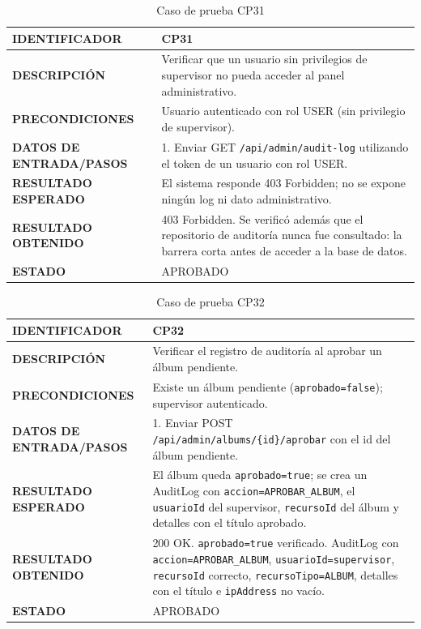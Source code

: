 \begin{table}[H]
\centering
\caption{Caso de prueba CP31}
\begin{tabular}{|p{3.5cm}|p{10.3cm}|}
\hline
\textbf{IDENTIFICADOR} & CP31 \\
\hline
\textbf{DESCRIPCIÓN} & Verificar que un usuario sin privilegios de supervisor no pueda acceder al panel administrativo. \\
\hline
\textbf{PRECONDICIONES} & Usuario autenticado con rol USER (sin privilegio de supervisor). \\
\hline
\textbf{DATOS DE ENTRADA/PASOS} & 1. Enviar GET \texttt{/api/admin/audit-log} utilizando el token de un usuario con rol USER. \\
\hline
\textbf{RESULTADO ESPERADO} & El sistema responde 403 Forbidden; no se expone ningún log ni dato administrativo. \\
\hline
\textbf{RESULTADO OBTENIDO} & 403 Forbidden. Se verificó además que el repositorio de auditoría nunca fue consultado: la barrera corta antes de acceder a la base de datos. \\
\hline
\textbf{ESTADO} & APROBADO \\
\hline
\end{tabular}
\end{table}

\begin{table}[H]
\centering
\caption{Caso de prueba CP32}
\begin{tabular}{|p{3.5cm}|p{10.3cm}|}
\hline
\textbf{IDENTIFICADOR} & CP32 \\
\hline
\textbf{DESCRIPCIÓN} & Verificar el registro de auditoría al aprobar un álbum pendiente. \\
\hline
\textbf{PRECONDICIONES} & Existe un álbum pendiente (\texttt{aprobado=false}); supervisor autenticado. \\
\hline
\textbf{DATOS DE ENTRADA/PASOS} & 1. Enviar POST \texttt{/api/admin/albums/\{id\}/aprobar} con el id del álbum pendiente. \\
\hline
\textbf{RESULTADO ESPERADO} & El álbum queda \texttt{aprobado=true}; se crea un AuditLog con \texttt{accion=APROBAR\_ALBUM}, el \texttt{usuarioId} del supervisor, \texttt{recursoId} del álbum y detalles con el título aprobado. \\
\hline
\textbf{RESULTADO OBTENIDO} & 200 OK. \texttt{aprobado=true} verificado. AuditLog con \texttt{accion=APROBAR\_ALBUM}, \texttt{usuarioId=supervisor}, \texttt{recursoId} correcto, \texttt{recursoTipo=ALBUM}, detalles con el título e \texttt{ipAddress} no vacío. \\
\hline
\textbf{ESTADO} & APROBADO \\
\hline
\end{tabular}
\end{table}

